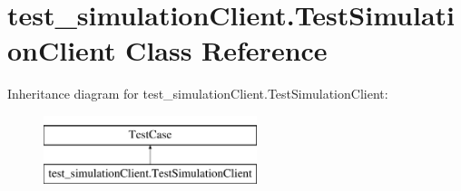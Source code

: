 \hypertarget{classtest__simulationClient_1_1TestSimulationClient}{}\section{test\+\_\+simulation\+Client.\+Test\+Simulation\+Client Class Reference}
\label{classtest__simulationClient_1_1TestSimulationClient}
Inheritance diagram for test\+\_\+simulation\+Client.\+Test\+Simulation\+Client\+:\begin{figure}[H]
\begin{center}
\leavevmode
\includegraphics[height=2.000000cm]{classtest__simulationClient_1_1TestSimulationClient}
\end{center}
\end{figure}
